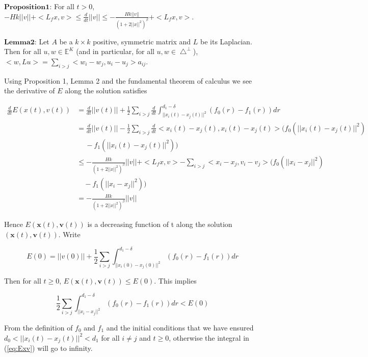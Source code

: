 $\mathbf{Proposition 1}$: For all $t>0$, $-Hk||v||+<L_fx, v>\leq\frac{d}{dt}||v||\leq-\frac{Hk||v||}{(1+2||x||^2)^{\beta}}+<L_fx, v>$.

$\mathbf{Lemma 2}$: Let $A$ be a $k\times k$ positive, symmetric matrix and $L$ be its Laplacian. Then for all $u, w\in\mathbb{E}^K$ (and in particular, for all $u, w\in\bigtriangleup^{\perp}$), $<w, Lu>=\sum_{i>j}<w_i-w_j, u_i-u_j>a_{ij}$.

\noindent
Using Proposition 1, Lemma 2 and the fundamental theorem of calculus we see the derivative of $E$ along the solution satisfies

\begin{equation}\label{eq:dExv}
\begin{aligned}
\frac{d}{dt}E(x(t), v(t))&=\frac{d}{dt}||v(t)||+\frac{1}{2}\sum_{i>j}\frac{d}{dt}\int_{||x_i(t)-x_j(t)||^2}^{d_1-\delta}(f_0(r)-f_1(r))dr\\
&=\frac{d}{dt}||v(t)||-\frac{1}{2}\sum_{i>j}\frac{d}{dt}<x_i(t)-x_j(t),x_i(t)-x_j(t)>(f_0(||x_i(t)-x_j(t)||^2)\\
&\quad\ -f_1(||x_i(t)-x_j(t)||^2))\\
&\leq-\frac{Hk}{(1+2||x||^2)^{\beta}}||v||+<L_fx, v>-\sum_{i>j}<x_i-x_j, v_i-v_j>(f_0(||x_i-x_j||^2)\\
&\quad-f_1(||x_i-x_j||^2))\\
&=-\frac{Hk}{(1+2||x||^2)^{\beta}}||v||
\end{aligned}
\end{equation}

\noindent
Hence $E(\mathbf{x}(t), \mathbf{v}(t))$ is a decreasing function of t along the solution $(\mathbf{x}(t), \mathbf{v}(t))$. Write

\begin{equation}\label{eq:E0}
E(0)=||v(0)||+\frac{1}{2}\sum_{i>j}\int_{||x_i(0)-x_j(0)||^2}^{d_1-\delta}(f_0(r)-f_1(r))dr
\end{equation}

\noindent
Then for all $t\geq0$, $E(\mathbf{x}(t), \mathbf{v}(t))\leq E(0)$. This implies

\begin{equation}
\frac{1}{2}\sum_{i>j}\int_{||x_i-x_j||^2}^{d_1-\delta}(f_0(r)-f_1(r))dr<E(0)
\end{equation}

\noindent
From the definition of $f_0$ and $f_1$ and the initial conditions that we have ensured $d_0<||x_i(t)-x_j(t)||^2<d_1$ for all $i\neq j$ and $t\geq0$, otherwise the integral in (\ref{eq:Exv}) will go to infinity.

